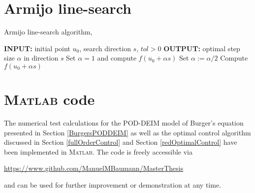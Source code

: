 \section{Armijo line-search}
\label{Armapp}
\begin{algorithm}[H]
\caption{Armijo line-search algorithm, \cite{Rao09}}
\label{alg:Armijo}
\begin{algorithmic}[1]
\STATE \textbf{INPUT: } initial point $u_0$, search direction $s$, $tol > 0$
\STATE \textbf{OUTPUT: } optimal step size $\alpha$ in direction $s$
\STATE Set $\alpha = 1$ and compute $f(u_0+\alpha s)$
\STATE Set $\alpha := \alpha/2$
\STATE Compute $f(u_0+\alpha s)$
\ENDWHILE
\end{algorithmic}
\end{algorithm}
\newpage
\section{\textsc{Matlab} code}
The numerical test calculations for the POD-DEIM model of Burger's equation presented in Section \ref{BurgersPODDEIM} as well as the optimal control algorithm discussed in Section \ref{fullOrderControl} and Section \ref{redOptimalControl} have been implemented in \textsc{Matlab}. The code is freely accessible via
\begin{center}
\url{https://www.github.com/ManuelMBaumann/MasterThesis}
\end{center}
and can be used for further improvement or demonstration at any time. 